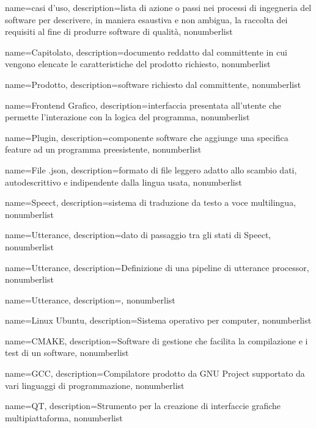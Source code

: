 {
	name={casi d'uso},
	description={lista di azione o passi nei processi di ingegneria del software per descrivere, in maniera esaustiva e non ambigua, la raccolta dei requisiti al fine di produrre software di qualità},
	nonumberlist
}


{
	name={Capitolato},
	description={documento reddatto dal committente in cui vengono elencate le caratteristiche del prodotto richiesto},
	nonumberlist
}

{
	name={Prodotto},
	description={software richiesto dal committente},
	nonumberlist
}

{
	name={Frontend Grafico},
	description={interfaccia presentata all'utente che permette l'interazione con la logica del programma},
	nonumberlist
}

{
	name={Plugin},
	description={componente software che aggiunge una specifica feature ad un programma preesistente},
	nonumberlist
}

{
	name={File .json},
	description={formato di file leggero adatto allo scambio dati, autodescrittivo e indipendente dalla lingua usata},
	nonumberlist
}

{
name={Speect},
description={sistema di traduzione da testo a voce multilingua},
nonumberlist
}

{
name={Utterance},
description={dato di passaggio tra gli stati di Speect},
nonumberlist
}

{
name={Utterance},
description={Definizione di una pipeline di utterance processor},
nonumberlist
}

{
	name={Utterance},
	description={},
	nonumberlist
}

{
	name={Linux Ubuntu},
	description={Sistema operativo per computer},
	nonumberlist
}

{
	name={CMAKE},
	description={Software di gestione che facilita la compilazione e i test di un software},
	nonumberlist
}

{
	name={GCC},
	description={Compilatore prodotto da GNU Project supportato da vari linguaggi di programmazione},
	nonumberlist
}

{
	name={QT},
	description={Strumento per la creazione di interfaccie grafiche multipiattaforma},
	nonumberlist
}

